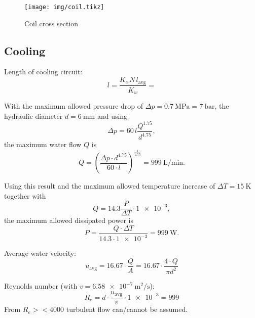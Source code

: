 \documentclass[10pt,a4paper,noendnumber=true]{scrartcl}
\begin{document}
\begin{figure}[H]
\centering
\texttt{[image: img/coil.tikz]}
\caption{Coil cross section}
\end{figure}



\subsection{Cooling}
Length of cooling circuit:
\begin{equation}
    l = \frac{K_c\,N\,l_\text{avg}}{K_w} = 
\end{equation}


With the maximum allowed pressure drop of $\Delta p = \SI{0.7}{\mega\pascal} = \SI{7}{\bar}$, the hydraulic diameter $d=\SI{6}{\mm}$ and using
\begin{equation}
\Delta p = 60\,l\frac{Q^{1.75}}{d^{4.75}},
\end{equation}
the maximum water flow $Q$ is
\begin{equation}
    Q = \left(\frac{\Delta p \cdot d^{4.75}}{60\cdot l}\right)^\frac{1}{1.75} = \SI{999}{\liter\per\minute}.
\end{equation}

Using this result and the maximum allowed temperature increase of $\Delta T=\SI{15}{\kelvin}$ together with
\begin{equation}
    Q = 14.3 \frac{P}{\Delta T} \cdot \num{1e-3},
\end{equation}
the maximum allowed dissipated power is
\begin{equation}
    P = \frac{Q \cdot \Delta T}{14.3 \cdot \num{1e-3}} = \SI{999}{\watt}.
\end{equation}

Average water velocity:
\begin{equation}
    u_\text{avg} = 16.67 \cdot \frac{Q}{A} = 16.67 \cdot \frac{4\cdot Q}{\pi d^2}
\end{equation}

Reynolds number (with $v=\SI{6.58e-7}{\meter\squared\per\second}$):
\begin{equation}
    R_e = d \cdot \frac{u_\text{avg}}{v} \cdot \num{1e-3} = \num{999}
\end{equation}
From $R_e><4000$ turbulent flow can/cannot be assumed.
\end{document}
